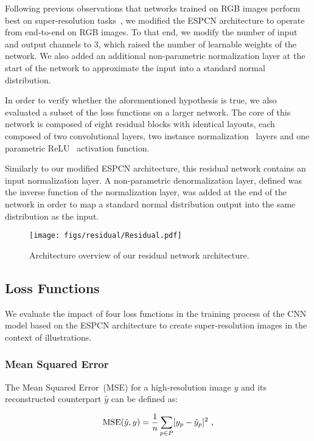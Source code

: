 Following previous observations that networks trained on RGB images perform best on super-resolution tasks~\cite{dong2015image}, we modified the ESPCN architecture to operate from end-to-end on RGB images. To that end, we modify the number of input and output channels to 3, which raised the number of learnable weights of the network. We also added an additional non-parametric normalization layer at the start of the network to approximate the input into a standard normal distribution.

In order to verify whether the aforementioned hypothesis is true, we also evaluated a subset of the loss functions on a larger network. The core of this network is composed of eight residual blocks with identical layouts, each composed of two convolutional layers, two instance normalization~\cite{ulyanov2016instance} layers and one parametric ReLU~\cite{he2015delving} activation function.

Similarly to our modified ESPCN architecture, this residual network contains an input normalization layer. A non-parametric denormalization layer, defined was the inverse function of the normalization layer, was added at the end of the network in order to map a standard normal distribution output into the same distribution as the input.

\begin{figure}[tbh]
  \centering
  \texttt{[image: figs/residual/Residual.pdf]}
  \caption{Architecture overview of our residual network architecture.}
  \label{figure:residual}
\end{figure}

\subsection{Loss Functions}

We evaluate the impact of four loss functions in the training process of the CNN model based on the ESPCN architecture to create super-resolution images in the context of illustrations.

\subsubsection{Mean Squared Error}

The Mean Squared Error~(MSE) for a high-resolution image $y$ and its reconstructed counterpart $\hat{y}$ can be defined as:

\begin{equation}
  \MSE(\hat{y}, y) = \frac{1}{n}\sum_{p \in{P}} [y_{p} - \hat{y}_{p}]^2~\text{,}
  \label{equation:mse}
\end{equation}

